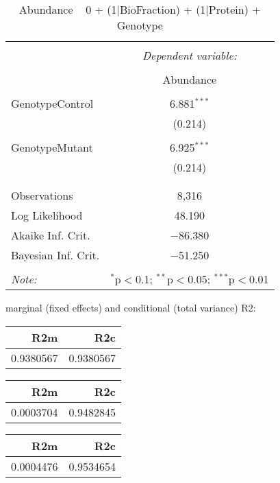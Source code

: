 \documentclass[11pt]{report}
\begin{document}
\begin{table}[!htbp] \centering 
  \caption{Abundance ~ 0 + (1|BioFraction) + (1|Protein) + Genotype} 
  \label{} 
\begin{tabular}{@{\extracolsep{5pt}}lc} 
\\[-1.8ex]\hline 
\hline \\[-1.8ex] 
 & \multicolumn{1}{c}{\textit{Dependent variable:}} \\ 
\cline{2-2} 
\\[-1.8ex] & Abundance \\ 
\hline \\[-1.8ex] 
 GenotypeControl & 6.881$^{***}$ \\ 
  & (0.214) \\ 
  & \\ 
 GenotypeMutant & 6.925$^{***}$ \\ 
  & (0.214) \\ 
  & \\ 
\hline \\[-1.8ex] 
Observations & 8,316 \\ 
Log Likelihood & 48.190 \\ 
Akaike Inf. Crit. & $-$86.380 \\ 
Bayesian Inf. Crit. & $-$51.250 \\ 
\hline 
\hline \\[-1.8ex] 
\textit{Note:}  & \multicolumn{1}{r}{$^{*}$p$<$0.1; $^{**}$p$<$0.05; $^{***}$p$<$0.01} \\ 
\end{tabular} 
\end{table} 
marginal (fixed effects) and conditional (total variance) R2:

\begin{tabular}{r|r}
\hline
R2m & R2c\\
\hline
0.9380567 & 0.9380567\\
\hline
\end{tabular}

\begin{tabular}{r|r}
\hline
R2m & R2c\\
\hline
0.0003704 & 0.9482845\\
\hline
\end{tabular}

\begin{tabular}{r|r}
\hline
R2m & R2c\\
\hline
0.0004476 & 0.9534654\\
\hline
\end{tabular}
\end{document}
